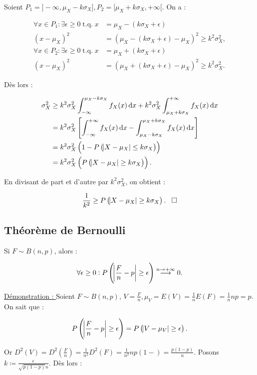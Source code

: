 \documentclass{article}
\DeclareMathOperator{\tq}{\text{ t.q. }}
\begin{document}
		Soient $P_1 = ]-\infty, \mu_X-k\sigma_X], P_2 = [\mu_X+k\sigma_X, +\infty[$. On a :

		\begin{align*}
			\forall x \in P_1 : \exists \epsilon \geq 0 \tq x &= \mu_X - (k\sigma_X + \epsilon) \\
			                                      (x-\mu_X)^2 &= (\mu_X - (k\sigma_X+\epsilon) - \mu_X)^2 \geq k^2\sigma_X^2, \\
			\forall x \in P_2 : \exists \epsilon \geq 0 \tq x &= \mu_X + (k\sigma_X + \epsilon) \\
			                                      (x-\mu_X)^2 &= (\mu_X + (k\sigma_X+\epsilon) - \mu_X)^2 \geq k^2\sigma_X^2.
		\end{align*}

		Dès lors :

		\begin{align*}
			\sigma_X^2 &\geq k^2\sigma_X^2\int_{-\infty}^{\mu_X-k\sigma_X}f_X(x)\dif x + k^2\sigma_X^2\int_{\mu_X+k\sigma_X}^{+\infty}f_X(x)\dif x \\
			           &= k^2\sigma_X^2\left[ \int_{-\infty}^{+\infty}f_X(x)\dif x - \int_{\mu_X-k\sigma_X}^{\mu_X+k\sigma_X}f_X(x)\dif x \right] \\
					   &= k^2\sigma_X^2\left(1-P\left(\abs{X-\mu_X} \leq k\sigma_X\right)\right) \\
					   &= k^2\sigma_X^2\left(P\left(\abs{X-\mu_X} \geq k\sigma_X\right)\right).
		\end{align*}

		En divisant de part et d'autre par $k^2\sigma_X^2$, on obtient :

		\[\frac 1{k^2} \geq P\left(\abs{X-\mu_X} \geq k\sigma_X\right).\;\;\;\square\]

	\subsection{Théorème de Bernoulli}
		Si $F \sim B(n, p)$, alors :
		
		\[\forall \epsilon \geq 0 : P\left(\abs{\frac Fn - p} \geq \epsilon\right) \stackrel{n\to+\infty}{\longrightarrow}0.\]

		\underline{Démonstration : } Soient $F \sim B(n, p)$, $V = \frac Fn, \mu_V = E(V) = \frac 1nE(F) = \frac 1nnp = p$. On sait que :

		\[P\left( \abs{\frac Fn-p} \geq \epsilon \right) = P\left( \abs{V-\mu_V} \geq \epsilon\right).\]

		Or $D^2(V) = D^2\left(\frac Fn\right) = \frac 1{n^2}D^2(F) = \frac 1{n^2}np(1-) = \frac {p(1-p)}n$. Posons $k \coloneqq \frac \epsilon{\sqrt {p(1-p)}n}$. Dès lors :
\end{document}
